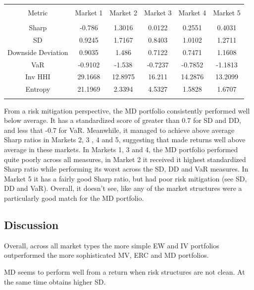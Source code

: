 \documentclass[11pt,preprint, authoryear]{elsarticle}
\let\origtable\table
\let\endorigtable\endtable
\renewenvironment{table}[1][2] {
    \expandafter\origtable\expandafter[H]
} {
    \endorigtable
}
\numberwithin{equation}{section}
\numberwithin{figure}{section}
\numberwithin{table}{section}
\begin{document}
\begin{table}[!htbp] \centering 
  \caption{Maximum Diversification} 
  \label{md} 
\begin{tabular}{@{\extracolsep{5pt}} cccccc} 
\\[-1.8ex]\hline 
\hline \\[-1.8ex] 
Metric & Market 1 & Market 2 & Market 3 & Market 4 & Market 5 \\ 
\hline \\[-1.8ex] 
Sharp & -0.786 & 1.3016 & 0.0122 & 0.2551 & 0.4031 \\ 
SD & 0.9245 & 1.7167 & 0.8403 & 1.0102 & 1.2711 \\ 
Downside Deviation & 0.9035 & 1.486 & 0.7122 & 0.7471 & 1.1608 \\ 
VaR & -0.9102 & -1.538 & -0.7237 & -0.7852 & -1.1813 \\ 
Inv HHI & 29.1668 & 12.8975 & 16.211 & 14.2876 & 13.2099 \\ 
Entropy & 21.1969 & 2.3394 & 4.5327 & 1.5828 & 1.6707 \\ 
\hline \\[-1.8ex] 
\end{tabular} 
\end{table}

From a risk mitigation perspective, the MD portfolio consistently
performed well below average. It has a standardized score of greater
than 0.7 for SD and DD, and less that -0.7 for VaR. Meanwhile, it
managed to achieve above average Sharp ratios in Markets 2, 3 , 4 and 5,
suggesting that made returns well above average in these markets. In
Markets 1, 3 and 4, the MD portfolio performed quite poorly across all
measures, in Market 2 it received it highest standardized Sharp ratio
while performing its worst across the SD, DD and VaR measures. In Market
5 it has a fairly good Sharp ratio, but had poor risk mitigation (see
SD, DD and VaR). Overall, it doesn't see, like any of the market
structures were a particularly good match for the MD portfolio.

\hypertarget{discussion}{%
\subsection{Discussion}\label{discussion}}

Overall, across all market types the more simple EW and IV portfolios
outperformed the more sophisticated MV, ERC and MD portfolios.

MD seems to perform well from a return when risk structures are not
clean. At the same time obtains higher SD.
\end{document}
